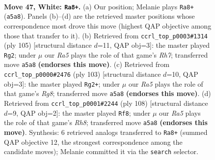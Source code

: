 \documentclass[11pt]{article}
\begin{document}
\clearpage

\begin{figure}[p]\centering
\begin{subfigure}{0.46\textwidth}\centering
\resizebox{\linewidth}{!}{%
\newchessgame
\chessboard[
  setfen={7k/7r/8/R7/P7/6K1/8/8 w - - 1 47},
  showmover=false,
  pgfstyle=straightmove, color=movearrow, markmove={a5-a8}
]}
\caption{}
\end{subfigure}\hfill
\begin{subfigure}{0.46\textwidth}\centering
\resizebox{\linewidth}{!}{%
\newchessgame
\chessboard[
  setfen={8/8/k7/3R4/3K2P1/8/7r/4b3 b - - 8 53},
  showmover=false,
  pgfstyle=straightmove, color=movearrow, markmove={h2-g2}
]}
\caption{}
\end{subfigure}
\\[4pt]
\begin{subfigure}{0.46\textwidth}\centering
\resizebox{\linewidth}{!}{%
\newchessgame
\chessboard[
  setfen={8/8/7p/3k3P/8/8/RK6/6r1 b - - 8 52},
  showmover=false,
  pgfstyle=straightmove, color=movearrow, markmove={g1-g2}
]}
\caption{}
\end{subfigure}\hfill
\begin{subfigure}{0.46\textwidth}\centering
\resizebox{\linewidth}{!}{%
\newchessgame
\chessboard[
  setfen={7R/1kr5/8/p7/4K3/8/P7/8 w - - 5 55},
  showmover=false,
  pgfstyle=straightmove, color=movearrow, markmove={h8-f8}
]}
\caption{}
\end{subfigure}
\caption{\textbf{Move 47, White: \texttt{Ra8+}.} (a) Our position; Melanie plays \texttt{Ra8+} (\texttt{a5a8}). Panels (b)--(d) are the retrieved master positions whose correspondence most drove this move (highest QAP objective among those that transfer to it). (b) Retrieved from \texttt{ccrl\_top\_p0003\#1314} (ply 105) [structural distance $d$=11, QAP obj=3]: the master played \texttt{Rg2}; under $\mu$ our \emph{Ra5} plays the role of that game's \emph{Rh7}; transferred move \texttt{a5a8} \textbf{(endorses this move)}. (c) Retrieved from \texttt{ccrl\_top\_p0000\#2476} (ply 103) [structural distance $d$=10, QAP obj=3]: the master played \texttt{Rg2+}; under $\mu$ our \emph{Ra5} plays the role of that game's \emph{Rg8}; transferred move \texttt{a5a8} \textbf{(endorses this move)}. (d) Retrieved from \texttt{ccrl\_top\_p0001\#2244} (ply 108) [structural distance $d$=9, QAP obj=2]: the master played \texttt{Rf8}; under $\mu$ our \emph{Ra5} plays the role of that game's \emph{Rh8}; transferred move \texttt{a5a8} \textbf{(endorses this move)}. Synthesis: 6 retrieved analogs transferred to \texttt{Ra8+} (summed QAP objective 12, the strongest correspondence among the candidate moves); Melanie committed it via the \texttt{search} selector.}
\label{fig:thought-m92}
\end{figure}
\end{document}
